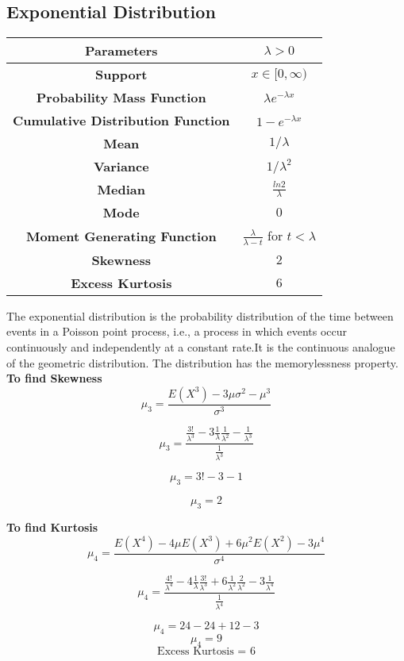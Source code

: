 \documentclass[14pt, a4paper]{article}
\theoremstyle{definition}
\begin{document}
\subsection{Exponential Distribution}
\begin{tabular}{|c|c|}  %
\hline
 \textbf{Parameters }& $\lambda > 0$ \\
 \hline
 \textbf{Support} &  $x \in [0, \infty ) $ \\
 \hline
 \textbf{Probability Mass Function} & $\lambda e^{-\lambda x} $ \\
 \hline
 \textbf{Cumulative Distribution Function} &  $1 -  e^{-\lambda x}$\\
 \hline
 \textbf{Mean} & $1/\lambda $\\ 
 \hline
 \textbf{Variance} & $1/\lambda^2 $ \\
 \hline
 \textbf{Median} & $\frac{ln 2}{\lambda}$ \\ 
 \hline
 \textbf{Mode} & $0$\\
 \hline
 \textbf{Moment Generating Function} & $\frac{\lambda}{\lambda - t}$ for $t < \lambda $\\
 \hline
 \textbf{Skewness} & $2$ \\
 \hline
 \textbf{Excess Kurtosis} & $6$  \\
 \hline
       
  \end{tabular}
  
The exponential distribution is the probability distribution of the time between events in a Poisson point process, i.e., a process in which events occur continuously and independently at a constant rate.It is the continuous analogue of the geometric distribution. The distribution has the memorylessness property. 
\textbf{To find Skewness}
\[ \mu_3= \frac{E(X^3) - 3 \mu \sigma^2 - \mu^3}{ \sigma^3} \]

\[\mu_3 = \frac{\frac{3!}{\lambda^3} - 3 \frac{1}{\lambda}\frac{1}{\lambda^2} - \frac{1}{\lambda^3}}{\frac{1}{\lambda^3}}\]

\[\mu_3 = 3! - 3- 1\]

\[\mu_3 = 2\]


\textbf{To find Kurtosis}
\[ \mu_4 = \frac{ E(X^4) - 4 \mu E(X^3) + 6 \mu^2 E(X^2) - 3 \mu^4}{ \sigma^4} \]
 
\[\mu_4 = \frac{\frac{4!}{\lambda^4} - 4 \frac{1}{\lambda}\frac{3!}{\lambda^3} +6 \frac{1}{\lambda^2}\frac{2}{\lambda^2} - 3 \frac{1}{\lambda^4}}{\frac{1}{\lambda^4}}\]
  
\[\mu_4 = 24 - 24 +12 -3\]
\[\mu_4 = 9\]
\[\text{Excess Kurtosis = } 6\]
  
\end{document}
